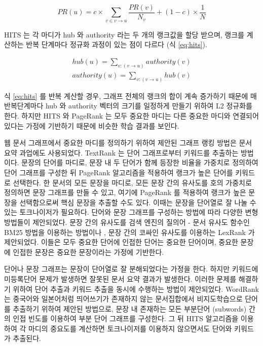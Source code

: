 \documentclass[oneside, ko,phd]{snuthesis_utf8_kor}
\begin{document}
\begin{equation}
  \label{eq:pagerank2}
  PR(u) = c \times \sum_{v \in v \rightarrow u} \frac{PR(v)}{N_v} + (1-c) \times \frac{1}{N}
\end{equation}

HITS 는 각 마디가 hub 와 authority 라는 두 개의 랭크값을 할당 받으며, 랭크를 계산하는 반복 단계마다 정규화 과정이 있는 점이 다르다 (식 \ref{eq:hits}).

\begin{equation}
  \label{eq:hits}
  \begin{aligned}
  hub(u) = \sum_{v:(v \rightarrow u)} authority(v) \\
  authority(u) = \sum_{v:(v \rightarrow u)} hub(v)
  \end{aligned}
\end{equation}

식 \ref{eq:hits} 를 반복 계산할 경우, 그래프 전체의 랭크의 합이 계속 증가하기 때문에 매 반복단계마다 hub 와 authority 벡터의 크기를 일정하게 만들기 위하여 L2 정규화를 한다.
하지만 HITS 와 PageRank 는 모두 중요한 마디는 다른 중요한 마디와 연결되어 있다는 가정에 기반하기 때문에 비슷한 학습 결과를 보인다.

웹 문서 그래프에서 중요한 마디를 정의하기 위하여 제안된 그래프 랭킹 방법은 문서 요약 과업에도 사용되었다.
TextRank \cite{mihalcea2004textrank} 는 단어 그래프로부터 키워드를 추출하는 방법이다.
문장의 단어를 마디로, 문장 내 두 단어가 함께 등장한 비율을 가중치로 정의하여 단어 그래프를 구성한 뒤 PageRank 알고리즘을 적용하여 랭크가 높은 단어를 키워드로 선택한다.
한 문서의 모든 문장을 마디로, 모든 문장 간의 유사도를 호의 가중치로 정의하면 문장 그래프를 만들 수 있고, 여기에 PageRank 를 적용하여 랭크가 높은 문장을 선택함으로써 핵심 문장을 추출할 수도 있다.
이때는 문장을 단어열로 잘 나눌 수 있는 토크나이저가 필요하다.
단어와 문장 그래프를 구성하는 방법에 따라 다양한 변형 방법들이 제안되었다.
문장 간의 유사도를 검색 엔진의 질의어 - 문서 유사도 함수인 BM25 \cite{robertson2009probabilistic} 방법을 이용하는 방법이나 \cite{barrios2016variations}, 문장 간의 코싸인 유사도를 이용하는 LexRank \cite{erkan2004lexrank} 가 제안되었다.
이들은 모두 중요한 단어에 인접한 단어는 중요한 단어이며, 중요한 문장에 인접한 문장은 중요한 문장이라는 가정에 기반한다.

단어나 문장 그래프는 문장이 단어열로 잘 분해되었다는 가정을 한다.
하지만 키워드에 미등록단어 문제가 발생하면 잘못된 문서 요약 결과가 발생한다.
이러한 문제를 해결하기 위하여 단어 추출과 키워드 추출을 동시에 수행하는 방법이 제안되었다.
WordRank \cite{chen2011simple} 는 중국어와 일본어처럼 띄어쓰기가 존재하지 않는 문서집합에서 비지도학습으로 단어를 추출하기 위하여 제안된 방법으로, 문장 내 존재하는 모든 부분단어 (subwords) 간의 인접 빈도를 이용하여 부분 단어 그래프를 구성한다.
그 뒤 HITS 알고리즘을 이용하여 각 마디의 중요도를 계산하면 토크나이저를 이용하지 않으면서도 단어와 키워드가 추출된다.
\end{document}
